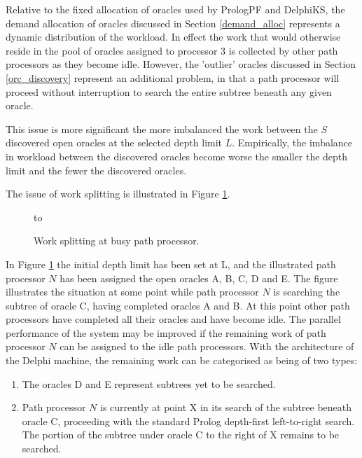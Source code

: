 Relative to the fixed allocation of oracles used by PrologPF and DelphiKS, the demand
allocation of oracles discussed in Section \ref{demand_alloc} represents a dynamic
distribution of the workload.  In effect the work that would otherwise reside in the
pool of oracles assigned to processor 3 is collected by other path processors as they
become idle.  However, the 'outlier' oracles discussed in Section \ref{orc_discovery}
represent an additional problem, in that a path processor will proceed without
interruption to search the entire subtree beneath any given oracle.

This issue is more significant the more imbalanced the work between
the $S$ discovered open oracles at the selected depth limit $L$.
Empirically, the imbalance in workload between the discovered oracles
become worse the smaller the depth limit and the fewer the discovered
oracles.

The issue of work splitting is illustrated in Figure \ref{work_split_figure}.

\begin{figure}[htb]
\vspace{5mm} \hbox to 
\caption{Work splitting at busy path processor.}
\vspace{5mm}
\label{work_split_figure}
\end{figure}

In Figure \ref{work_split_figure} the initial depth limit has been set at L, and the
illustrated path processor $N$ has been assigned the open oracles A, B, C, D and E.
The figure illustrates the situation at some point while path processor $N$ is
searching the subtree of oracle C, having completed oracles A and B.  At this
point other path processors have completed all their oracles and have become idle.
The parallel performance of the system may be improved if the remaining work of
path processor $N$ can be assigned to the idle path processors.  With the architecture
of the Delphi machine, the remaining work can be categorised as being of two types:
\begin{enumerate}
\item{The oracles D and E represent subtrees yet to be searched.}
\item{Path processor $N$ is currently at point X in its search of the subtree beneath
  oracle C, proceeding with the standard Prolog depth-first left-to-right search.  The
  portion of the subtree under oracle C to the right of X remains to be searched.}
\end{enumerate}

